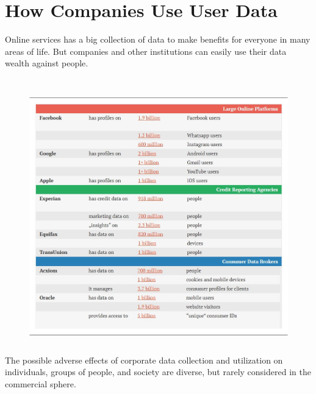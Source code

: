 \documentclass[12pt,a4paper,conference]{IEEEtran}
\begin{document}
\section{How Companies Use User Data}
Online services has a big collection of data to make benefits for everyone in many areas of life. But 
companies and other institutions can easily use their data wealth against people.\\
\\
\begin{figure}[h!]
  \includegraphics[height=11cm,width=\linewidth]{Capture.jpg}
\end{figure}
 The possible adverse effects of corporate data collection and utilization on individuals, groups of people, and society are diverse, but rarely considered in the commercial sphere. \\
\end{document}
